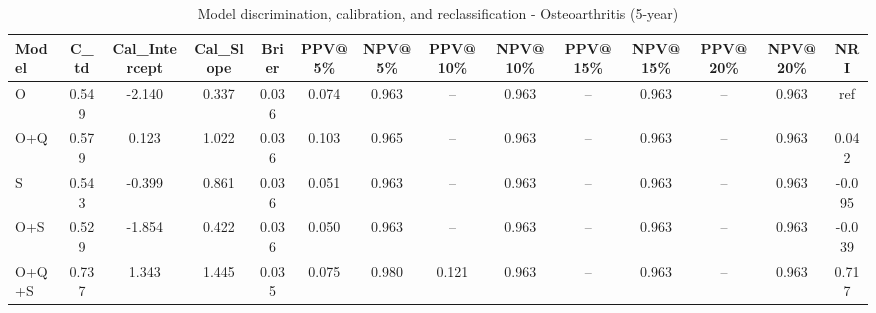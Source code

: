 \begin{table}[htbp]
\centering
\small
\caption{Model discrimination, calibration, and reclassification - Osteoarthritis (5-year)}
\label{tab:perf_osteoarthritis_5y}
\begin{tabular}{lccccccccccccc}
\toprule
Model & C\_td & Cal\_Intercept & Cal\_Slope & Brier & PPV@5\% & NPV@5\% & PPV@10\% & NPV@10\% & PPV@15\% & NPV@15\% & PPV@20\% & NPV@20\% & NRI \\
\midrule
O & 0.549 & -2.140 & 0.337 & 0.036 & 0.074 & 0.963 & -- & 0.963 & -- & 0.963 & -- & 0.963 & ref \\
O+Q & 0.579 & 0.123 & 1.022 & 0.036 & 0.103 & 0.965 & -- & 0.963 & -- & 0.963 & -- & 0.963 & 0.042 \\
S & 0.543 & -0.399 & 0.861 & 0.036 & 0.051 & 0.963 & -- & 0.963 & -- & 0.963 & -- & 0.963 & -0.095 \\
O+S & 0.529 & -1.854 & 0.422 & 0.036 & 0.050 & 0.963 & -- & 0.963 & -- & 0.963 & -- & 0.963 & -0.039 \\
O+Q+S & 0.737 & 1.343 & 1.445 & 0.035 & 0.075 & 0.980 & 0.121 & 0.963 & -- & 0.963 & -- & 0.963 & 0.717 \\
\bottomrule
\end{tabular}
\end{table}